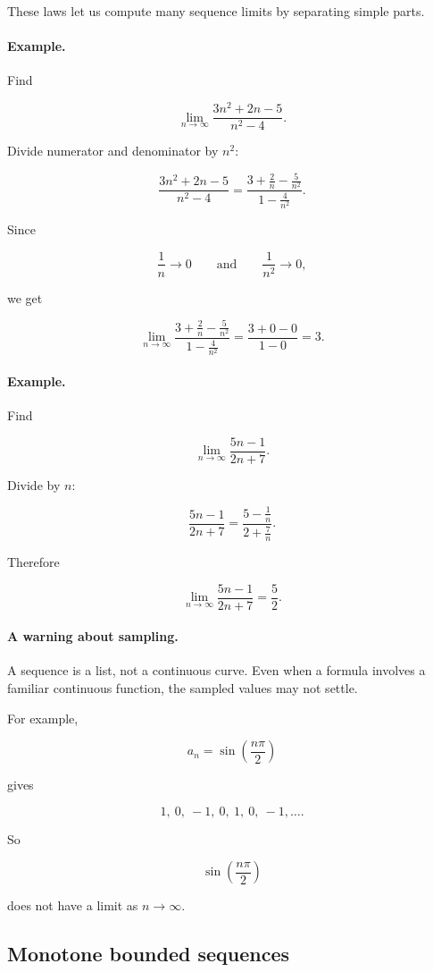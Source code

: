 These laws let us compute many sequence limits by separating simple parts.

\paragraph{Example.}
Find

\[
\lim_{n\to\infty}\frac{3n^2+2n-5}{n^2-4}.
\]

Divide numerator and denominator by \(n^2\):

\[
\frac{3n^2+2n-5}{n^2-4}
=
\frac{3+\frac2n-\frac5{n^2}}{1-\frac4{n^2}}.
\]

Since

\[
\frac1n\to0
\qquad\text{and}\qquad
\frac1{n^2}\to0,
\]

we get

\[
\lim_{n\to\infty}\frac{3+\frac2n-\frac5{n^2}}{1-\frac4{n^2}}
=
\frac{3+0-0}{1-0}
=
\boxed{3}.
\]

\paragraph{Example.}
Find

\[
\lim_{n\to\infty}\frac{5n-1}{2n+7}.
\]

Divide by \(n\):

\[
\frac{5n-1}{2n+7}
=
\frac{5-\frac1n}{2+\frac7n}.
\]

Therefore

\[
\lim_{n\to\infty}\frac{5n-1}{2n+7}
=
\boxed{\frac52}.
\]

\paragraph{A warning about sampling.}
A sequence is a list, not a continuous curve.  Even when a formula involves a familiar
continuous function, the sampled values may not settle.

For example,

\[
a_n=\sin\left(\frac{n\pi}{2}\right)
\]

gives

\[
1,\ 0,\ -1,\ 0,\ 1,\ 0,\ -1,\ldots.
\]

So

\[
\sin\left(\frac{n\pi}{2}\right)
\]

does not have a limit as \(n\to\infty\).

\subsection{Monotone bounded sequences}
\label{subsec:monotone-bounded-sequences}

